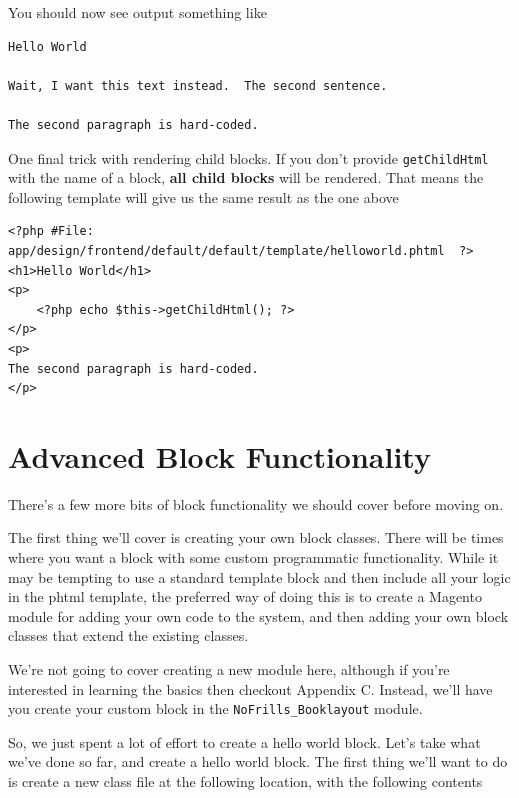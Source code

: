 \documentclass[oneside]{book}
\begin{document}
You should now see output something like

\begin{lstlisting}
Hello World

Wait, I want this text instead.  The second sentence.

The second paragraph is hard-coded.

\end{lstlisting}


One final trick with rendering child blocks.  If you don't provide \footnotesize\texttt{getChildHtml} \normalsize  with the name of a block, \textbf{all child blocks} will be rendered.  That means the following template will give us the same result as the one above

\begin{lstlisting}
<?php #File: app/design/frontend/default/default/template/helloworld.phtml  ?>
<h1>Hello World</h1>
<p>
    <?php echo $this->getChildHtml(); ?>    
</p>
<p>
The second paragraph is hard-coded.
</p>

\end{lstlisting}


\section{Advanced Block Functionality}

There's a few more bits of block functionality we should cover before moving on. 

The first thing we'll cover is creating your own block classes.  There will be times where you want a block with some custom programmatic functionality.  While it may be tempting to use a standard template block and then include all your logic in the phtml template, the preferred way of doing this is to create a Magento module for adding your own code to the system, and then adding your own block classes that extend the existing classes.

We're not going to cover creating a new module here, although if you're interested in learning the basics then checkout Appendix C.  Instead, we'll have you create your custom block in the \footnotesize\texttt{NoFrills\_Booklayout} \normalsize  module.

So, we just spent a lot of effort to create a hello world block.  Let's take what we've done so far, and create a hello world block.  The first thing we'll want to do is create a new class file at the following location, with the following contents
\end{document}
